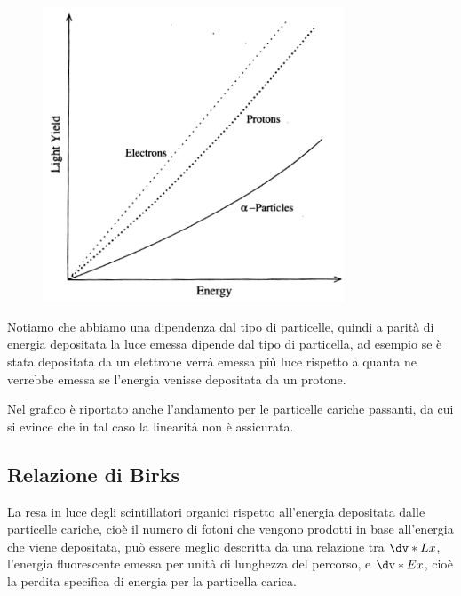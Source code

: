 \begin{minipage}{0.49\textwidth}
   \begin{figure}[H]
      \centering
      \includegraphics[width=0.8\textwidth]{immagini/risposta_in_luce.png}
   \end{figure}
\end{minipage}
\begin{minipage}{0.5\textwidth}
   \vspace{0.3cm}Notiamo che abbiamo una dipendenza dal tipo di particelle, quindi a parità di energia depositata la luce emessa dipende dal tipo di particella, ad esempio se è stata depositata da un elettrone verrà emessa più luce rispetto a quanta ne verrebbe emessa se l'energia venisse depositata da un protone.
   
   Nel grafico è riportato anche l'andamento per le particelle cariche passanti, da cui si evince che in tal caso la linearità non è assicurata.
\end{minipage}

\subsection{Relazione di Birks}
La resa in luce degli scintillatori organici rispetto all'energia depositata dalle particelle cariche, cioè il numero di fotoni che vengono prodotti in base all'energia che viene depositata, può essere meglio descritta da una relazione tra $\dv*{L}{x}$, l'energia fluorescente emessa per unità di lunghezza del percorso, e $\dv*{E}{x}$, cioè la perdita specifica di energia per la particella carica.

